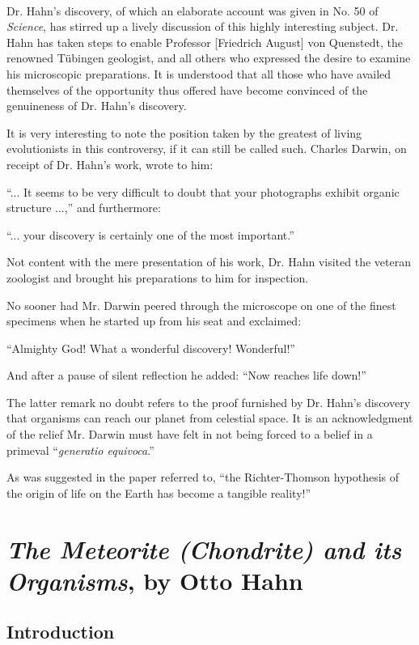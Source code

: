 \documentclass[a4paper, 12pt, oneside]{article}
\begin{document}
\paragraph*{}
Dr. Hahn's discovery, of which an elaborate account was given in No. 50 of \emph{Science}, has stirred up a lively discussion of this highly interesting subject. Dr. Hahn has taken steps to enable Professor [Friedrich August] von Quenstedt, the renowned Tübingen geologist, and all others who expressed the desire to examine his microscopic preparations. It is understood that all those who have availed themselves of the opportunity thus offered have become convinced of the genuineness of Dr. Hahn's discovery.

It is very interesting to note the position taken by the greatest of living evolutionists in this controversy, if it can still be called such. Charles Darwin, on receipt of Dr. Hahn's work, wrote to him:

``... It seems to be very difficult to doubt that your photographs exhibit organic structure ...,'' and furthermore:

``... your discovery is certainly one of the most important.''

Not content with the mere presentation of his work, Dr. Hahn visited the veteran zoologist and brought his preparations to him for inspection.

No sooner had Mr. Darwin peered through the microscope on one of the finest specimens when he started up from his seat and exclaimed:

``Almighty God! What a wonderful discovery! Wonderful!''

And after a pause of silent reflection he added: ``Now reaches life down!''

The latter remark no doubt refers to the proof furnished by Dr. Hahn's discovery that organisms can reach our planet from celestial space. It is an acknowledgment of the relief Mr. Darwin must have felt in not being forced to a belief in a primeval ``\emph{generatio equivoca}.''

As was suggested in the paper referred to, ``the Richter-Thomson hypothesis of the origin of life on the Earth has become a tangible reality!''
\clearpage
\section{\emph{The Meteorite (Chondrite) and its Organisms}, by Otto Hahn}
\subsection{Introduction}
\end{document}
